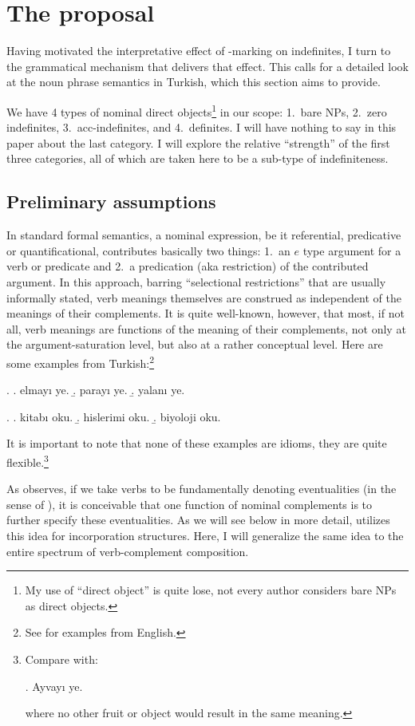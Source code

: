 \documentclass[11pt,a4paper]{article}
\begin{document}
\section{The proposal}

Having motivated the interpretative effect of \acc-marking on indefinites, I
turn to the grammatical mechanism that delivers that effect. This calls for a
detailed look at the noun phrase semantics in Turkish, which this section aims
to provide.

We have 4 types of nominal direct objects\footnote{My use of ``direct object''
is quite lose, not every author considers bare NPs as direct objects.} in our
scope: 1.\ bare NPs, 2.\ zero indefinites, 3.\ acc-indefinites, and 4.\
definites. I will have nothing to say in this paper about the last category. I
will explore the relative ``strength'' of the first three categories, all of
which are taken here to be a sub-type of indefiniteness. 

\subsection{Preliminary assumptions}

In standard formal semantics, a nominal expression, be it referential,
predicative or quantificational, contributes basically two things: 1.\ an $e$
type argument for a verb or predicate and 2.\ a predication (aka restriction)
of the contributed argument. In this approach, barring ``selectional
restrictions'' that are usually informally stated, verb meanings themselves are
construed as independent of the meanings of their complements. It is quite
well-known, however, that most, if not all, verb meanings are functions of the
meaning of their complements, not only at the argument-saturation level, but
also at a rather conceptual level. Here are some examples from
Turkish:\footnote{See  for examples from English.}

\ex.
\a. elmayı ye.
\b. parayı ye.
\b. yalanı ye.

\ex.
\a. kitabı oku.
\b. hislerimi oku.
\b. biyoloji oku.


It is important to note that none of these examples are idioms, they are quite
flexible.\footnote{Compare with:

\ex. Ayvayı ye.

where no other fruit or object would result in the same meaning.
}

As  observes, if we take verbs to be fundamentally denoting
eventualities (in the sense of \cttx{bach86a}), it is conceivable that one
function of nominal complements is to further specify these eventualities. As
we will see below in more detail, \ctnm{carlson03} utilizes this idea for
incorporation structures. Here, I will generalize the same idea to the entire
spectrum of verb-complement composition.
\end{document}
